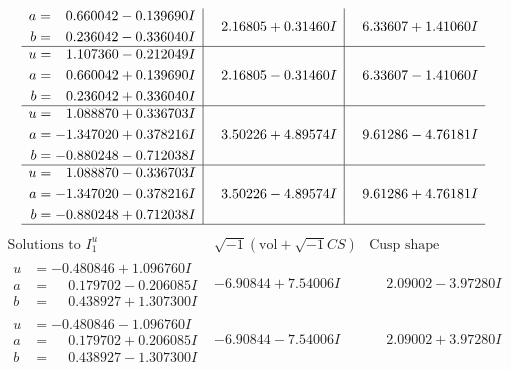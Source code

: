 \documentclass[1p]{elsarticle_modified}
\theoremstyle{definition}
\newcommand{\I}{\sqrt{-1}}
\begin{document}
$$\begin{array}{c|c|c}
\begin{aligned}
a &= \phantom{-}0.660042 - 0.139690 I \\
b &= \phantom{-}0.236042 - 0.336040 I\end{aligned}
 & \phantom{-}2.16805 + 0.31460 I & \phantom{-}6.33607 + 1.41060 I \\ \hline\begin{aligned}
u &= \phantom{-}1.107360 - 0.212049 I \\
a &= \phantom{-}0.660042 + 0.139690 I \\
b &= \phantom{-}0.236042 + 0.336040 I\end{aligned}
 & \phantom{-}2.16805 - 0.31460 I & \phantom{-}6.33607 - 1.41060 I \\ \hline\begin{aligned}
u &= \phantom{-}1.088870 + 0.336703 I \\
a &= -1.347020 + 0.378216 I \\
b &= -0.880248 - 0.712038 I\end{aligned}
 & \phantom{-}3.50226 + 4.89574 I & \phantom{-}9.61286 - 4.76181 I \\ \hline\begin{aligned}
u &= \phantom{-}1.088870 - 0.336703 I \\
a &= -1.347020 - 0.378216 I \\
b &= -0.880248 + 0.712038 I\end{aligned}
 & \phantom{-}3.50226 - 4.89574 I & \phantom{-}9.61286 + 4.76181 I\\
 \hline 
 \end{array}$$\newpage$$\begin{array}{c|c|c}  
\text{Solutions to }I^u_{1}& \I (\text{vol} + \sqrt{-1}CS) & \text{Cusp shape}\\
 \hline 
\begin{aligned}
u &= -0.480846 + 1.096760 I \\
a &= \phantom{-}0.179702 - 0.206085 I \\
b &= \phantom{-}0.438927 + 1.307300 I\end{aligned}
 & -6.90844 + 7.54006 I & \phantom{-}2.09002 - 3.97280 I \\ \hline\begin{aligned}
u &= -0.480846 - 1.096760 I \\
a &= \phantom{-}0.179702 + 0.206085 I \\
b &= \phantom{-}0.438927 - 1.307300 I\end{aligned}
 & -6.90844 - 7.54006 I & \phantom{-}2.09002 + 3.97280 I \\ \hline\begin{aligned}

\end{aligned}
\end{array}$$
\end{document}
